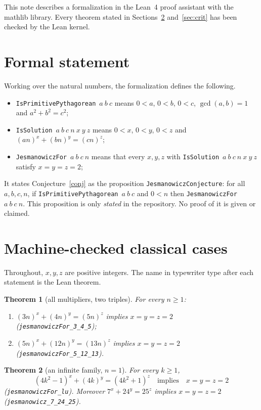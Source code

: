 \documentclass[11pt,a4paper]{article}
\newtheorem{theorem}{Theorem}
\theoremstyle{remark}
\newcommand{\lean}[1]{\texttt{#1}}
\begin{document}
This note describes a formalization in the Lean~4 proof assistant with the
mathlib library. Every theorem stated in Sections~\ref{sec:results} and~\ref{sec:crit} has
been checked by the Lean kernel.

\section{Formal statement}

Working over the natural numbers, the formalization defines the following.
\begin{itemize}
\item \lean{IsPrimitivePythagorean}~$a\ b\ c$ means $0<a$, $0<b$, $0<c$,
$\gcd(a,b)=1$ and $a^2+b^2=c^2$;
\item \lean{IsSolution}~$a\ b\ c\ n\ x\ y\ z$ means $0<x$, $0<y$, $0<z$ and
$(an)^x+(bn)^y=(cn)^z$;
\item \lean{JesmanowiczFor}~$a\ b\ c\ n$ means that every $x,y,z$ with
\lean{IsSolution}~$a\ b\ c\ n\ x\ y\ z$ satisfy $x=y=z=2$;
\end{itemize}
It states Conjecture~\ref{conj} as the proposition
\lean{JesmanowiczConjecture}: for all $a,b,c,n$, if
\lean{IsPrimitivePythagorean}~$a\ b\ c$ and $0<n$ then
\lean{JesmanowiczFor}~$a\ b\ c\ n$.
This proposition is only \emph{stated} in the repository. No proof of it is
given or claimed.

\section{Machine-checked classical cases}\label{sec:results}

Throughout, $x,y,z$ are positive integers. The name in typewriter type after
each statement is the Lean theorem.

\begin{theorem}[all multipliers, two triples]\label{thm:alln}
For every $n\ge 1$:
\begin{enumerate}
\item $(3n)^x+(4n)^y=(5n)^z$ implies $x=y=z=2$ \\ \textup{(\lean{jesmanowiczFor\_3\_4\_5})};
\item $(5n)^x+(12n)^y=(13n)^z$ implies $x=y=z=2$ \\ \textup{(\lean{jesmanowiczFor\_5\_12\_13})}.
\end{enumerate}
\end{theorem}

\begin{theorem}[an infinite family, $n=1$]\label{thm:lu}
For every $k\ge 1$,
\[
(4k^2-1)^x+(4k)^y=(4k^2+1)^z \quad\text{implies}\quad x=y=z=2
\]
\textup{(\lean{jesmanowiczFor\_lu})}. Moreover $7^x+24^y=25^z$ implies $x=y=z=2$
\textup{(\lean{jesmanowicz\_7\_24\_25})}.
\end{theorem}
\end{document}
